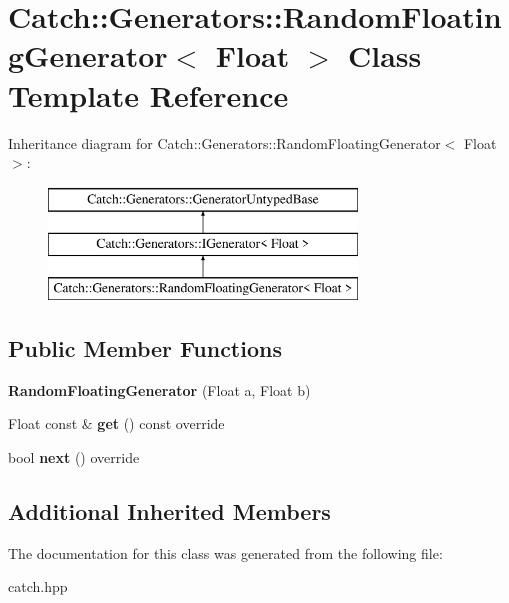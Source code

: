 \hypertarget{classCatch_1_1Generators_1_1RandomFloatingGenerator}{}\section{Catch\+::Generators\+::Random\+Floating\+Generator$<$ Float $>$ Class Template Reference}
\label{classCatch_1_1Generators_1_1RandomFloatingGenerator}
Inheritance diagram for Catch\+::Generators\+::Random\+Floating\+Generator$<$ Float $>$\+:\begin{figure}[H]
\begin{center}
\leavevmode
\includegraphics[height=3.000000cm]{classCatch_1_1Generators_1_1RandomFloatingGenerator}
\end{center}
\end{figure}
\subsection*{Public Member Functions}
\begin{DoxyCompactItemize}
\item 
\mbox{\label{classCatch_1_1Generators_1_1RandomFloatingGenerator_abce275ce88f7c3465addd7a98b6c408d}} 
{\bfseries Random\+Floating\+Generator} (Float a, Float b)
\item 
\mbox{\label{classCatch_1_1Generators_1_1RandomFloatingGenerator_a0dea6fa1f9e2647df022f0b588cf0a8f}} 
Float const  \& {\bfseries get} () const override
\item 
\mbox{\label{classCatch_1_1Generators_1_1RandomFloatingGenerator_a6a65e5f16abd884f58c31581b2a0d6db}} 
bool {\bfseries next} () override
\end{DoxyCompactItemize}
\subsection*{Additional Inherited Members}


The documentation for this class was generated from the following file\+:\begin{DoxyCompactItemize}
\item 
catch.\+hpp\end{DoxyCompactItemize}
